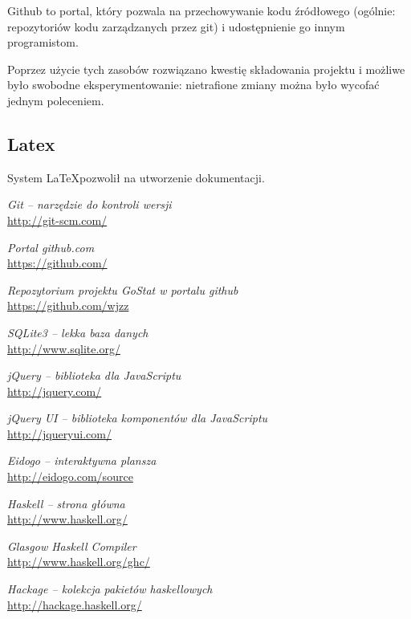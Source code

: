 \documentclass[10pt,leqno]{article}
\begin{document}
Github \cite{github} to portal, który pozwala na przechowywanie kodu źródłowego (ogólnie: repozytoriów kodu zarządzanych przez git)
i udostępnienie go innym programistom.

Poprzez użycie tych zasobów rozwiązano kwestię składowania projektu i możliwe było swobodne eksperymentowanie: nietrafione zmiany
można było wycofać jednym poleceniem.

\subsection{Latex}
System \LaTeX pozwolił na utworzenie dokumentacji.


\begin{thebibliography}{9}

  \emph{Git -- narzędzie do kontroli wersji} \\
  \url{http://git-scm.com/}

  \emph{Portal github.com} \\
  \url{https://github.com/}

  \emph{Repozytorium projektu GoStat w portalu github} \\
  \url{https://github.com/wjzz}

  \emph{SQLite3 -- lekka baza danych} \\
  \url{http://www.sqlite.org/}

  \emph{jQuery -- biblioteka dla JavaScriptu} \\
  \url{http://jquery.com/}

  \emph{jQuery UI -- biblioteka komponentów dla JavaScriptu} \\
  \url{http://jqueryui.com/}

  \emph{Eidogo -- interaktywna plansza} \\
  \url{http://eidogo.com/source}

  \emph{Haskell -- strona główna} \\
  \url{http://www.haskell.org/}

  \emph{Glasgow Haskell Compiler} \\
  \url{http://www.haskell.org/ghc/}

  \emph{Hackage -- kolekcja pakietów haskellowych} \\
  \url{http://hackage.haskell.org/}


\end{thebibliography}
\end{document}
